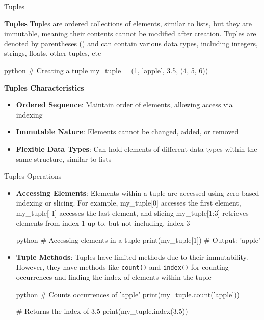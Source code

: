 \documentclass[
	11pt, 
]{beamer}
\begin{document}
\begin{frame}[fragile]{Tuples}
\scriptsize
    
\begin{block}{\textbf{Tuples}}
 Tuples are ordered collections of elements, similar to lists, but they are immutable, meaning their contents cannot be modified after creation. Tuples are denoted by parentheses () and can contain various data types, including integers, strings, floats, other tuples, etc
\end{block}
\begin{mintedbox}{python}
# Creating a tuple
my_tuple = (1, 'apple', 3.5, (4, 5, 6))
\end{mintedbox}

\begin{exampleblock}{\textbf{Tuples Characteristics}}
    \begin{itemize}
        \item \textbf{Ordered Sequence}: Maintain order of elements, allowing access via indexing
        \item \textbf{Immutable Nature}: Elements cannot be changed, added, or removed
        \item \textbf{Flexible Data Types}: Can hold elements of different data types within the same structure, similar to lists
    \end{itemize}    
\end{exampleblock}

\end{frame}


\begin{frame}[fragile]{Tuples Operations}
\scriptsize
\begin{itemize}
    \item \textbf{Accessing Elements}: Elements within a tuple are accessed using zero-based indexing or slicing. For example, my\_tuple[0] accesses the first element, my\_tuple[-1] accesses the last element, and slicing my\_tuple[1:3] retrieves elements from index 1 up to, but not including, index 3

    \vspace{.25cm}

    \begin{mintedbox}{python}
# Accessing elements in a tuple
print(my_tuple[1])  # Output: 'apple'
    \end{mintedbox}

    \item \textbf{Tuple Methods}: Tuples have limited methods due to their immutability. However, they have methods like \texttt{count()} and \texttt{index()} for counting occurrences and finding the index of elements within the tuple

    \begin{mintedbox}{python}
# Counts occurrences of 'apple' 
print(my_tuple.count('apple'))  

# Returns the index of 3.5 
print(my_tuple.index(3.5))  
    \end{mintedbox}
    
\end{itemize}
\end{frame}
\end{document}
